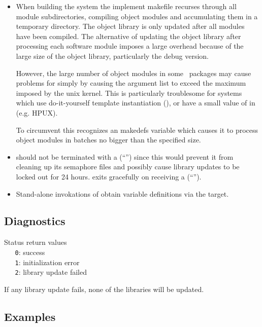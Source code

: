 \begin{itemize}
\item
   When building the system the implement makefile recurses through all module
   subdirectories, compiling object modules and accumulating them in a
   temporary directory.  The object library is only updated after all modules
   have been compiled.  The alternative of updating the object library after
   processing each software module imposes a large overhead because of the
   large size of the object library, particularly the debug version.
 
   However, the large number of object modules in some \aipspp\ packages may
   cause problems for  simply by causing the argument list to
   exceed the maximum imposed by the unix kernel.  This is particularly
   troublesome for systems which use do-it-yourself template instantiation 
   (), or have a small value of 
   in  (e.g. HPUX).

   To circumvent this  recognizes an  makedefs
   variable which causes it to process object modules in batches no bigger
   than the specified size.
\item
    should not be terminated with a 
   (``'') since this would prevent it from cleaning up its
   semaphore files and possibly cause library updates to be locked out for 24
   hours.   exits gracefully on receiving a 
   (``'').
\item
   Stand-alone invokations of  obtain  variable
   definitions via the  target.
\end{itemize}

\subsection*{Diagnostics}

Status return values
\\ \verb+   0+: success
\\ \verb+   1+: initialization error
\\ \verb+   2+: library update failed

\noindent
If any library update fails, none of the libraries will be updated.

\subsection*{Examples}

